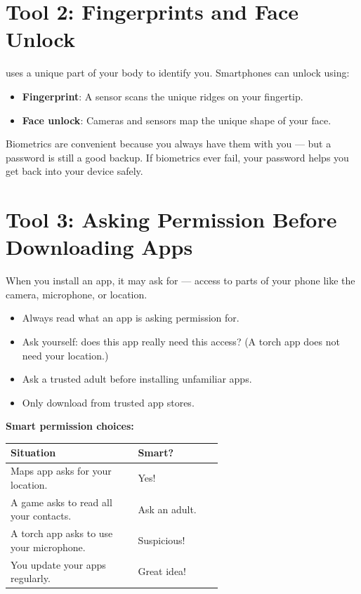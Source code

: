 \sectionrule

\section*{Tool 2: Fingerprints and Face Unlock}

 uses a unique part of your body to identify you.
Smartphones can unlock using:
\begin{itemize}
  \item \textbf{Fingerprint}: A sensor scans the unique ridges on your fingertip.
  \item \textbf{Face unlock}: Cameras and sensors map the unique shape of your face.
\end{itemize}

Biometrics are convenient because you always have them with you —
but a password is still a good backup.
If biometrics ever fail, your password helps you get back into your device safely.

\sectionrule

\section*{Tool 3: Asking Permission Before Downloading Apps}

When you install an app, it may ask for  —
access to parts of your phone like the camera, microphone, or location.

\begin{itemize}
  \item Always read what an app is asking permission for.
  \item Ask yourself: does this app really need this access?
        (A torch app does not need your location.)
  \item Ask a trusted adult before installing unfamiliar apps.
  \item Only download from trusted app stores.
\end{itemize}

\begin{quickmap}
  \textbf{Smart permission choices:}
  \begin{center}
  \begin{tabular}{p{0.6\linewidth}l}
    \textbf{Situation} & \textbf{Smart?} \\
    \hline
    Maps app asks for your location.          & Yes! \\
    A game asks to read all your contacts.    & Ask an adult. \\
    A torch app asks to use your microphone.  & Suspicious! \\
    You update your apps regularly.           & Great idea! \\
  \end{tabular}
  \end{center}
\end{quickmap}


